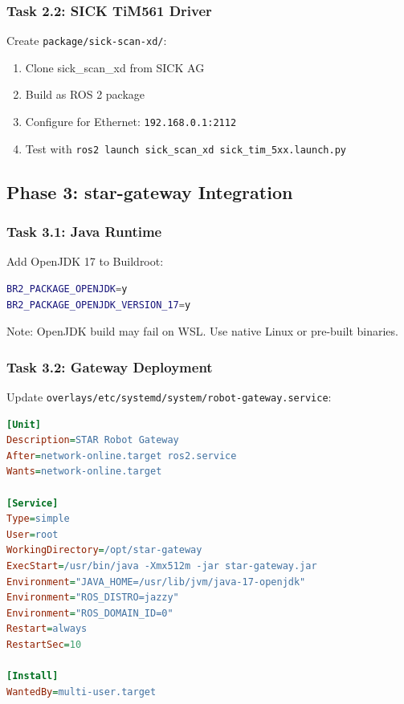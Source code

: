\subsubsection{Task 2.2: SICK TiM561 Driver}

Create \texttt{package/sick-scan-xd/}:

\begin{enumerate}
    \item Clone sick\_scan\_xd from SICK AG
    \item Build as ROS 2 package
    \item Configure for Ethernet: \texttt{192.168.0.1:2112}
    \item Test with \texttt{ros2 launch sick\_scan\_xd sick\_tim\_5xx.launch.py}
\end{enumerate}

\subsection{Phase 3: star-gateway Integration}

\subsubsection{Task 3.1: Java Runtime}

Add OpenJDK 17 to Buildroot:

\begin{lstlisting}[language=bash, caption=Add to rpi5\_64\_defconfig]
BR2_PACKAGE_OPENJDK=y
BR2_PACKAGE_OPENJDK_VERSION_17=y
\end{lstlisting}

Note: OpenJDK build may fail on WSL. Use native Linux or pre-built binaries.

\subsubsection{Task 3.2: Gateway Deployment}

Update \texttt{overlays/etc/systemd/system/robot-gateway.service}:

\begin{lstlisting}[language=ini, caption=robot-gateway.service]
[Unit]
Description=STAR Robot Gateway
After=network-online.target ros2.service
Wants=network-online.target

[Service]
Type=simple
User=root
WorkingDirectory=/opt/star-gateway
ExecStart=/usr/bin/java -Xmx512m -jar star-gateway.jar
Environment="JAVA_HOME=/usr/lib/jvm/java-17-openjdk"
Environment="ROS_DISTRO=jazzy"
Environment="ROS_DOMAIN_ID=0"
Restart=always
RestartSec=10

[Install]
WantedBy=multi-user.target
\end{lstlisting}

